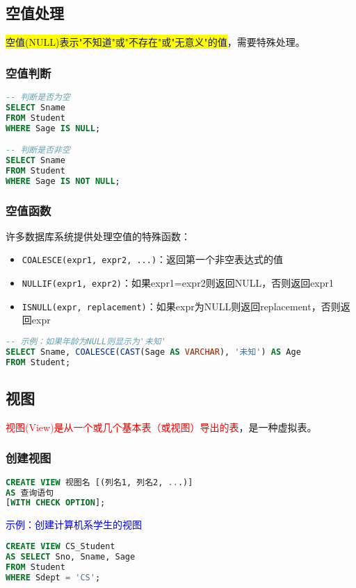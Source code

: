 \documentclass{../../note}
\begin{document}
\subsection{空值处理}
\colorbox{yellow}{空值(NULL)表示"不知道"或"不存在"或"无意义"的值}，需要特殊处理。

\subsubsection{空值判断}
\begin{lstlisting}[language=SQL]
-- 判断是否为空
SELECT Sname
FROM Student
WHERE Sage IS NULL;

-- 判断是否非空
SELECT Sname
FROM Student
WHERE Sage IS NOT NULL;
\end{lstlisting}

\subsubsection{空值函数}
许多数据库系统提供处理空值的特殊函数：
\begin{itemize}
    \item \texttt{COALESCE(expr1, expr2, ...)}：返回第一个非空表达式的值
    \item \texttt{NULLIF(expr1, expr2)}：如果expr1=expr2则返回NULL，否则返回expr1
    \item \texttt{ISNULL(expr, replacement)}：如果expr为NULL则返回replacement，否则返回expr
\end{itemize}

\begin{lstlisting}[language=SQL]
-- 示例：如果年龄为NULL则显示为'未知'
SELECT Sname, COALESCE(CAST(Sage AS VARCHAR), '未知') AS Age
FROM Student;
\end{lstlisting}

\subsection{视图}
\textcolor{red}{视图(View)是从一个或几个基本表（或视图）导出的表}，是一种虚拟表。

\subsubsection{创建视图}
\begin{lstlisting}[language=SQL]
CREATE VIEW 视图名 [(列名1, 列名2, ...)]
AS 查询语句
[WITH CHECK OPTION];
\end{lstlisting}

\textcolor{blue}{示例：创建计算机系学生的视图}
\begin{lstlisting}[language=SQL]
CREATE VIEW CS_Student
AS SELECT Sno, Sname, Sage
FROM Student
WHERE Sdept = 'CS';
\end{lstlisting}
\end{document}
